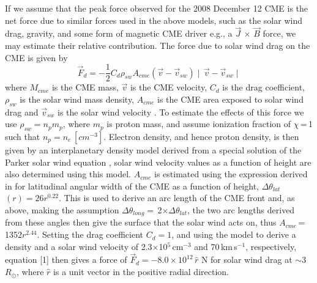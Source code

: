 If we assume that the peak force observed for the 2008 December 12 CME is the net force due to similar forces used in the above models, such as 
the solar wind drag, gravity, and some form of magnetic CME driver e.g., a $\vec{J}\,\times\,\vec{B}$ force, we may estimate their relative 
contribution.
The force due to solar wind drag on the CME is given by
\begin{equation}
\vec{F}_d=-\frac{1}{2}C_{d}\rho_{sw}A_{cme}(\vec{v}-\vec{v}_{sw})\mid\,\vec{v}-\vec{v}_{sw}\mid
\end{equation}
where $M_{cme}$ is the CME mass, $\vec{v}$ is the CME velocity, $C_{d}$ is the drag coefficient, $\rho_{sw}$ is the solar wind mass density, $A_
{cme}$ is the CME area exposed to solar wind drag and $\vec{v}_{sw}$ is the solar wind velocity \citep{malo10}. To estimate the effects of this force 
we use $\rho_{sw}=n_{p}m_{p}$, where $m_{p}$ is proton mass, and assume ionization fraction of $\chi$\,=\,1 such that $n_{p}=n_{e}$\,$[cm^{-3}]$. 
Electron density, and hence proton density, is then given by an interplanetary density model derived from a special solution of the Parker solar wind 
equation \citep{Mann1999}, solar wind velocity values as a function of height are also determined using this model. $A_{cme}$ is estimated using 
the expression derived in \citet{byr10} for latitudinal angular width of the CME as a function of height, $\Delta$$\theta_{lat}$$(r)=26r^{0.22}$. This is 
used to derive an arc length of the CME front and, as above, making the assumption $\Delta$$\theta_{long}$$=$\,2$\times$$\Delta$$\theta_{lat}$,
the two arc lengths derived from these angles then give the surface that the solar wind acts on, thus $A_{cme}$\,=\,1352$r^{2.44}$. Setting the drag 
coefficient $C_{d}=1$, and using the \citet{Mann1999} model to derive a density and a solar wind velocity of 2.3$\times$10$^{5}$\,cm$^{-3}$  and 
70\,km\,s$^{-1}$, respectively, equation [1] then gives a force of $\vec{F}_{d}=-8.0\times10^{12}\,\hat{r}\,$\,N for solar wind drag at $\sim$3\,$R_
{\odot}$, where $\hat{r}$ is a unit vector in the positive radial direction. 

